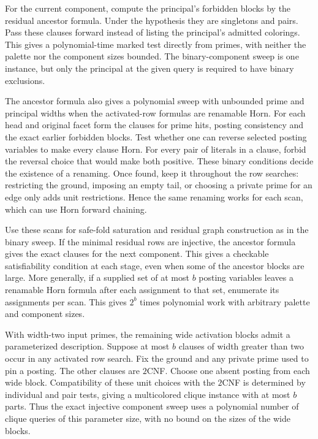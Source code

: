For the current component, compute the principal's
forbidden blocks by the residual ancestor formula.
Under the hypothesis they are singletons and pairs.
Pass these clauses forward instead of listing the
principal's admitted colorings. This gives a polynomial-time
marked test directly from primes, with neither
the palette nor the component sizes bounded.
The binary-component sweep is one instance, but
only the principal at the given query is required
to have binary exclusions.

The ancestor formula also gives a polynomial
sweep with unbounded prime and principal widths
when the activated-row formulas are renamable
Horn. For each head and original facet form the
clauses for prime hits, posting consistency and
the exact earlier forbidden blocks. Test whether
one can reverse selected posting variables to
make every clause Horn. For every pair of
literals in a clause, forbid the reversal choice
that would make both positive. These binary
conditions decide the existence of a renaming.
Once found, keep it throughout the row searches:
restricting the ground, imposing an empty tail,
or choosing a private prime for an edge only
adds unit restrictions. Hence the same renaming
works for each scan, which can use Horn forward
chaining.

Use these scans for safe-fold saturation and
residual graph construction as in the binary
sweep. If the minimal residual rows are injective,
the ancestor formula gives the exact clauses for
the next component. This gives a
checkable satisfiability condition at each
stage, even when some of the ancestor blocks
are large. More generally, if a supplied set
of at most $b$ posting variables leaves a
renamable Horn formula after each assignment
to that set, enumerate its assignments per
scan. This gives $2^b$ times polynomial work
with arbitrary palette and component sizes.

With width-two input primes, the remaining
wide activation blocks admit a parameterized
description. Suppose at most $b$ clauses of
width greater than two occur in any activated
row search. Fix the ground and any private
prime used to pin a posting. The other clauses
are $2$CNF. Choose one absent posting from
each wide block. Compatibility of these unit
choices with the $2$CNF is determined by
individual and pair tests, giving a multicolored
clique instance with at most $b$ parts. Thus
the exact injective component sweep uses a
polynomial number of clique queries of this
parameter size, with no bound on the sizes of
the wide blocks.

